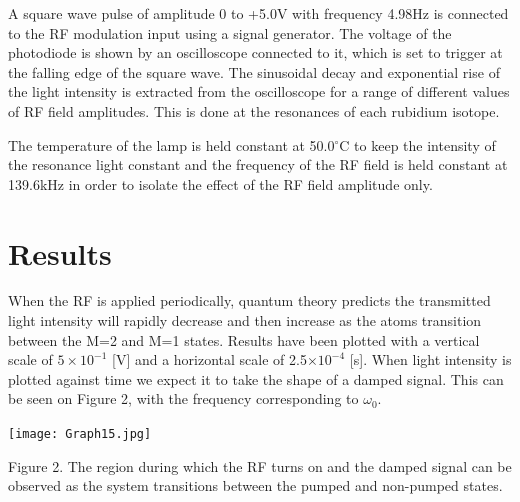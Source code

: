 \documentclass{article}
\begin{document}
\begin{multicols*}{2}
A square wave pulse of amplitude 0 to +5.0V with frequency 4.98Hz is connected to the RF modulation input using a signal generator. The voltage of the photodiode is shown by an oscilloscope connected to it, which is set to trigger at the falling edge of the square wave. The sinusoidal decay and exponential rise of the light intensity is extracted from the oscilloscope for a range of different values of RF field amplitudes. This is done at the resonances of each rubidium isotope.

The temperature of the lamp is held constant at 50.0$^{\circ}$C to keep the intensity of the resonance light constant and the frequency of the RF field is held constant at 139.6kHz in order to isolate the effect of the RF field amplitude only.

\section{Results}
When the RF is applied periodically, quantum theory predicts the transmitted light intensity will rapidly decrease and then increase as the atoms transition between the M=2 and M=1 states. Results have been plotted with a vertical scale of $5\times10^{-1}$ [V] and a horizontal scale of 2.5$\times10^{-4}$ [s]. When light intensity is plotted against time we expect it to take the shape of a damped signal. This can be seen on Figure 2, with the frequency corresponding to $\omega_{0}$. 
\newline

\begin{Figure}
\begin{center}
\texttt{[image: Graph15.jpg]}
\end{center}
\footnotesize
    Figure 2. The region during which the RF turns on and the damped signal can be observed as the system transitions between the pumped and non-pumped states.
\normalsize
\vspace{0.2mm}
\end{Figure}
\newline


\end{multicols*}
\end{document}

